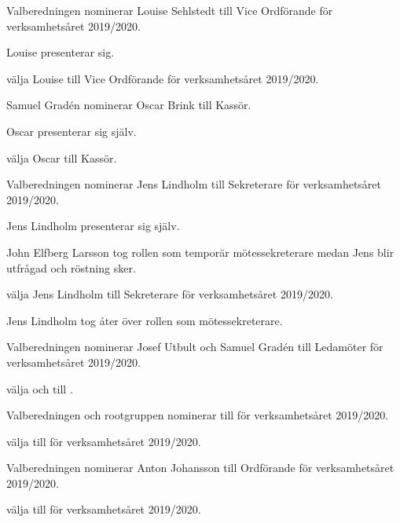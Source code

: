\documentclass{protokoll}
\begin{document}
Valberedningen nominerar Louise Sehlstedt till Vice Ordförande för verksamhetsåret 2019/2020.

Louise presenterar sig.
\begin{beslut}
  \att välja Louise till Vice Ordförande för verksamhetsåret 2019/2020.
\end{beslut}

Samuel Gradén nominerar Oscar Brink till Kassör. 

Oscar presenterar sig själv.

\begin{beslut}
  \att välja Oscar till Kassör.
\end{beslut}

Valberedningen nominerar Jens Lindholm till Sekreterare för verksamhetsåret 2019/2020.

Jens Lindholm presenterar sig själv.

John Elfberg Larsson tog rollen som temporär mötessekreterare medan Jens blir
utfrågad och röstning sker.


\begin{beslut}
  \att välja Jens Lindholm till Sekreterare för verksamhetsåret 2019/2020.
\end{beslut}

Jens Lindholm tog åter över rollen som mötessekreterare.

Valberedningen nominerar Josef Utbult och Samuel Gradén till Ledamöter för 
verksamhetsåret 2019/2020.


\begin{beslut}
  \att välja  och  till .
\end{beslut}
Valberedningen och rootgruppen nominerar  till  för verksamhetsåret 2019/2020.

\begin{beslut}
  \att välja  till för verksamhetsåret 2019/2020.
\end{beslut}

Valberedningen nominerar Anton Johansson till Ordförande för verksamhetsåret 2019/2020.

\begin{beslut}
  \att välja  till för verksamhetsåret 2019/2020.
\end{beslut}

\end{document}
